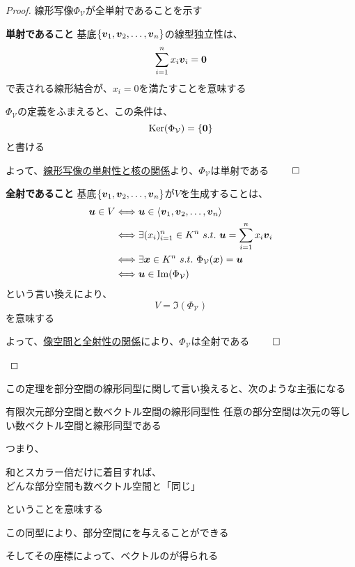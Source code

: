 \documentclass[../../../topic_linear-algebra]{subfiles}
\begin{document}
\begin{proof}
  線形写像$\Phi_{\mathcal{V}}$が全単射であることを示す

  \begin{subpattern}{\bfseries 単射であること}
    基底$\{ \vb*{v}_1, \vb*{v}_2, \dots, \vb*{v}_n \}$の線型独立性は、
    \begin{equation*}
      \sum_{i=1}^n x_i \vb*{v}_i = \vb*{0}
    \end{equation*}
    で表される線形結合が、$x_i = 0$を満たすことを意味する

    $\Phi_{\mathcal{V}}$の定義をふまえると、この条件は、
    \begin{equation*}
      \operatorname{Ker}(\Phi_{\mathcal{V}}) = \{ \vb*{0} \}
    \end{equation*}
    と書ける

    よって、\hyperref[thm:injective-iff-trivial-kernel]{線形写像の単射性と核の関係}より、$\Phi_{\mathcal{V}}$は単射である $\qed$
  \end{subpattern}

  \begin{subpattern}{\bfseries 全射であること}
    基底$\{ \vb*{v}_1, \vb*{v}_2, \dots, \vb*{v}_n \}$が$V$を生成することは、
    \begin{align*}
      \vb*{u} \in V & \Longleftrightarrow \vb*{u} \in \langle \vb*{v}_1, \vb*{v}_2, \dots, \vb*{v}_n \rangle           \\
                    & \Longleftrightarrow \exists (x_i)_{i=1}^n \in K^n \,\, s.t. \,\, \vb*{u} = \sum_{i=1}^n x_i \vb*{v}_i \\
                    & \Longleftrightarrow \exists \vb*{x} \in K^n \,\, s.t. \,\, \Phi_{\mathcal{V}}(\vb*{x}) = \vb*{u}      \\
                    & \Longleftrightarrow \vb*{u} \in \Im(\Phi_{\mathcal{V}})
    \end{align*}
    という言い換えにより、
    \begin{equation*}
      V = \Im(\Phi_{\mathcal{V}})
    \end{equation*}
    を意味する

    よって、\hyperref[sec:image-and-surjectivity]{像空間と全射性の関係}により、$\Phi_{\mathcal{V}}$は全射である $\qed$
  \end{subpattern}
\end{proof}

この定理を部分空間の線形同型に関して言い換えると、次のような主張になる

\begin{theorem}{有限次元部分空間と数ベクトル空間の線形同型性}\label{thm:subspace-isomorphic-to-Kn}
  任意の部分空間は次元の等しい数ベクトル空間と線形同型である
\end{theorem}

つまり、
\begin{shaded}
  和とスカラー倍だけに着目すれば、\\
  どんな部分空間も数ベクトル空間と「同じ」
\end{shaded}
ということを意味する

\br

この同型により、部分空間にを与えることができる

そしてその座標によって、ベクトルのが得られる
\end{document}
